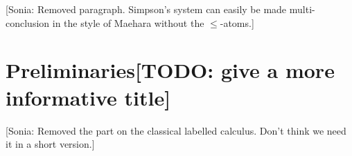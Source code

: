 \documentclass[twoside]{aiml18}
\newcommand{\sonia}[1]{{\color{blue}[Sonia: #1]}}
\newcommand{\todo}[1]{{\color{red}[TODO: #1]}}
\begin{document}
\sonia{Removed paragraph. Simpson's system can easily be made multi-conclusion in the style of Maehara without the $\le$-atoms.}

\section{Preliminaries\todo{give a more informative title}}

\sonia{Removed the part on the classical labelled calculus. Don't think we need it in a short version.}
\end{document}
